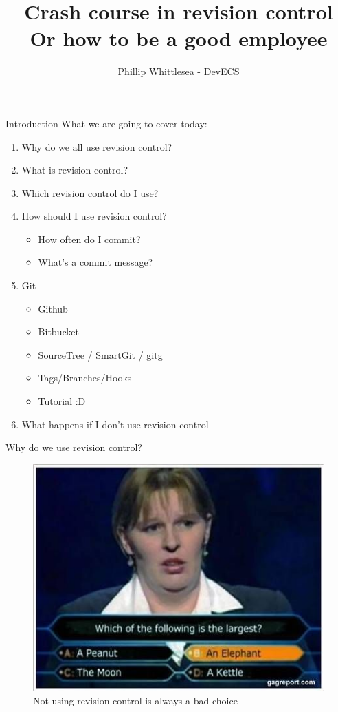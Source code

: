 \documentclass{beamer}
\title[Using Git like a baus]{Crash course in revision control\\Or how to be a good employee}
\author{Phillip Whittlesea - DevECS}
\institute{Electronics and Computer Science}
\begin{document}
\begin{frame}
    \titlepage
\end{frame}

\begin{frame}{Introduction}
    What we are going to cover today:
    \begin{enumerate}
        \item Why do we all use revision control?
        \item What is revision control?
        \item Which revision control do I use?
        \item How should I use revision control?
        \begin{itemize}
        	\item How often do I commit?
        	\item What's a commit message?
        \end{itemize}
        \item Git
        \begin{itemize}
     	    \item Github
    	    \item Bitbucket
        	\item SourceTree / SmartGit / gitg
        	\item Tags/Branches/Hooks
        	\item Tutorial :D
        \end{itemize}
        \item What happens if I don't use revision control
    \end{enumerate}
\end{frame}

\begin{frame}{Why do we use revision control?}
    \begin{figure}[ht]
        \centering
        \includegraphics[width=0.8\linewidth]{img/losing.jpg}
        \caption{Not using revision control is always a bad choice}
        \label{fig:figure2}
    \end{figure}
\end{frame}
\end{document}
